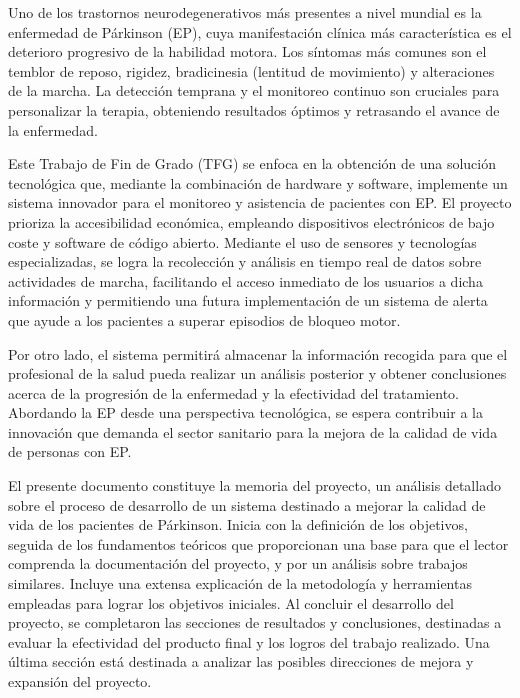 
Uno de los trastornos neurodegenerativos más presentes a nivel mundial es la enfermedad de Párkinson (EP), cuya manifestación clínica más característica es el deterioro progresivo de la habilidad motora. Los síntomas más comunes son el temblor de reposo, rigidez, bradicinesia (lentitud de movimiento) y alteraciones de la marcha. La detección temprana y el monitoreo continuo son cruciales para personalizar la terapia, obteniendo resultados óptimos y retrasando el avance de la enfermedad. 

Este Trabajo de Fin de Grado (TFG) se enfoca en la obtención de una solución tecnológica que, mediante la combinación de hardware y software, implemente un sistema innovador para el monitoreo y asistencia de pacientes con EP. El proyecto prioriza la accesibilidad económica, empleando dispositivos electrónicos de bajo coste y software de código abierto. Mediante el uso de sensores y tecnologías especializadas, se logra la recolección y análisis en tiempo real de datos sobre actividades de marcha, facilitando el acceso inmediato de los usuarios a dicha información y permitiendo una futura implementación de un sistema de alerta que ayude a los pacientes a superar episodios de bloqueo motor.

Por otro lado, el sistema permitirá almacenar la información recogida para que el profesional de la salud pueda realizar un análisis posterior y obtener conclusiones acerca de la progresión de la enfermedad y la efectividad del tratamiento. Abordando la EP desde una perspectiva tecnológica, se espera contribuir a la innovación que demanda el sector sanitario para la mejora de la calidad de vida de personas con EP.

El presente documento constituye la memoria del proyecto, un análisis detallado sobre el proceso de desarrollo de un sistema destinado a mejorar la calidad de vida de los pacientes de Párkinson. Inicia con la definición de los objetivos, seguida de los fundamentos teóricos que proporcionan una base para que el lector comprenda la documentación del proyecto, y por un análisis sobre trabajos similares. Incluye una extensa explicación de la metodología y herramientas empleadas para lograr los objetivos iniciales. Al concluir el desarrollo del proyecto, se completaron las secciones de resultados y conclusiones, destinadas a evaluar la efectividad del producto final y los logros del trabajo realizado. Una última sección está destinada a analizar las posibles direcciones de mejora y expansión del proyecto.

